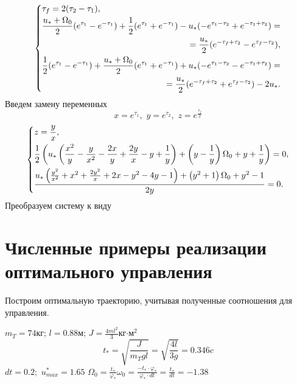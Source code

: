 \documentclass[a4paper,14pt]{article}
\theoremstyle{plain} %
\theoremstyle{definition} %
\theoremstyle{remark} %
\begin{document}
{\begin{equation}\label{fullconnected}
    \left\{
    \begin{multlined}
        \tau_f=2(\tau_2-\tau_1), \\
        \shoveleft{\frac{u_*+\Omega_0}{2}(e^{\tau_1}-e^{-\tau_1})+\frac{1}{2}(e^{\tau_1}+e^{-\tau_1})-u_*(-e^{\tau_1-\tau_2}+e^{-\tau_1+\tau_2})=} \\
        \shoveright{=\frac{u_*}{2}(e^{-\tau_f+\tau_2}-e^{\tau_f-\tau_2}),} \\
        \shoveleft{\frac{1}{2}(e^{\tau_1}-e^{-\tau_1})+\frac{u_*+\Omega_0}{2}(e^{\tau_1}+e^{-\tau_1})+u_*(-e^{\tau_1-\tau_2}-e^{-\tau_1+\tau_2})=} \\
        =\frac{u_*}{2}(e^{-\tau_f+\tau_2}+e^{\tau_f-\tau_2})-2u_*.
    \end{multlined}
    \right.
\end{equation}
Введем замену переменных
\[
    x=e^{\tau_1} ,\,\,y=e^{\tau_2} ,\,\,z=e^{\frac{\tau_f}{2}}
\]
\[
    \left\{ {\begin{aligned}
                 & z=\frac{y}{x}, \hfill                                                         \\
                 & \frac{1}{2} \left(u_* \left(\frac{x^2}{y}-\frac{y}{x^2}-\frac{2 x}{y}+\frac{2
                        y}{x}-y+\frac{1}{y}\right)+\left(y-\frac{1}{y}\right) \Omega
                _0+y+\frac{1}{y}\right)=0, \hfill                                                \\
                 & \frac{u_* \left(\frac{y^2}{x^2}+x^2+\frac{2 y^2}{x}+2 x-y^2-4
                y-1\right)+\left(y^2+1\right) \Omega _0+y^2-1}{2 y}=0. \hfill                    \\
            \end{aligned}} \right.
\]
Преобразуем систему к виду


\section{Численные примеры реализации оптимального управления}
Построим оптимальную траекторию, учитывая полученные соотношения для управления.

$m_T=74$кг; $l=0.88$м; $J=\frac{4ml^2}{3}$кг$\cdot$м$^2$
\[
    t_\ast=\sqrt{\frac{J}{m_Tgl}}=\sqrt{\frac{4l}{3g}}=0.346c
\]
$dt=0.2;$
$u^*_{max}=1.65$
$\Omega_0=\frac{t_\ast}{\varphi_\ast}\omega_0=\frac{-t_\ast\cdot\varphi_\ast}{\varphi_\ast\cdot dt}=\frac{t_\ast}{dt}=-1.38$

}
\end{document}
